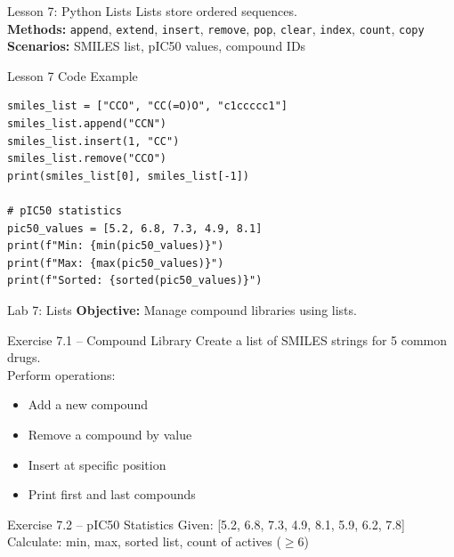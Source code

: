 \documentclass{beamer}
\begin{document}
\begin{frame}{Lesson 7: Python Lists}
    \small
    Lists store ordered sequences.\\[0.5em]
    \textbf{Methods:} \texttt{append}, \texttt{extend}, \texttt{insert}, \texttt{remove}, \texttt{pop}, \texttt{clear}, \texttt{index}, \texttt{count}, \texttt{copy}\\[0.5em]
    \textbf{Scenarios:} SMILES list, pIC50 values, compound IDs
\end{frame}

\begin{frame}[fragile]{Lesson 7 Code Example}
    \small
    \begin{lstlisting}[style=codeStyle]
smiles_list = ["CCO", "CC(=O)O", "c1ccccc1"]
smiles_list.append("CCN")
smiles_list.insert(1, "CC")
smiles_list.remove("CCO")
print(smiles_list[0], smiles_list[-1])

# pIC50 statistics
pic50_values = [5.2, 6.8, 7.3, 4.9, 8.1]
print(f"Min: {min(pic50_values)}")
print(f"Max: {max(pic50_values)}")
print(f"Sorted: {sorted(pic50_values)}")
    \end{lstlisting}
\end{frame}

\begin{frame}{\textcolor{labcolor}{Lab 7: Lists}}
    \footnotesize
    \textbf{Objective:} Manage compound libraries using lists.
    \vspace{0.2em}
    \begin{block}{Exercise 7.1 -- Compound Library}
        Create a list of SMILES strings for 5 common drugs.\\
        Perform operations:
        \begin{itemize}\setlength{\itemsep}{0pt}
            \item Add a new compound
            \item Remove a compound by value
            \item Insert at specific position
            \item Print first and last compounds
        \end{itemize}
    \end{block}
    \vspace{0.2em}
    \begin{block}{Exercise 7.2 -- pIC50 Statistics}
        Given: [5.2, 6.8, 7.3, 4.9, 8.1, 5.9, 6.2, 7.8]\\
        Calculate: min, max, sorted list, count of actives ($\geq$6)
    \end{block}
\end{frame}
\end{document}
